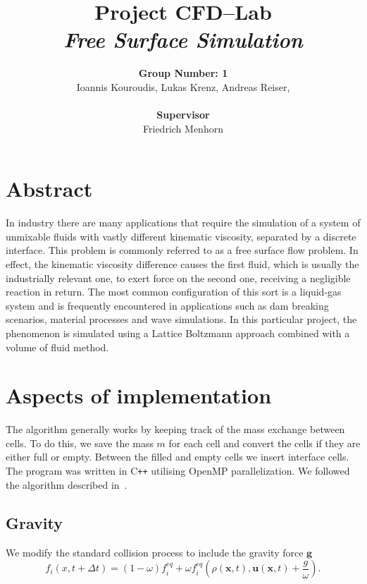\documentclass[10pt,a4paper,notitlepage]{article}
\begin{document}
\title{Project CFD--Lab\\ \textit{Free Surface Simulation}}
\author{\textbf{Group Number: 1}\\Ioannis Kouroudis, Lukas Krenz, Andreas Reiser,  \\ \\\textbf{Supervisor}\\Friedrich Menhorn}
\maketitle
\section*{Abstract}
In industry there are many applications that require the simulation of a system of unmixable fluids with vastly different kinematic viscosity, separated by a discrete interface.  This problem is commonly referred to as a free surface flow problem. In effect, the kinematic viscosity difference causes the first fluid, which is usually the industrially relevant one, to exert force on the second one, receiving a negligible reaction in return. The most common configuration of this sort is a liquid-gas system and is frequently encountered in applications such as dam breaking scenarios, material processes and wave simulations.
In this particular project, the phenomenon is simulated  using a Lattice Boltzmann approach combined with a volume of fluid method.
        
\section{Aspects of implementation}
The algorithm generally works by keeping track of the mass exchange between cells.
To do this, we save the mass $m$ for each cell and convert the cells if they are either full or empty.
Between the filled and empty cells we insert interface cells.
The program was written in C\texttt{++} utilising OpenMP parallelization.
We followed the algorithm described in~\cite{thurey2007physically}.

\subsection{Gravity }
We modify the standard collision process to include the gravity force $\bm{g}$~\cite{thurey2006optimization}
\begin{equation}\label{eq:BGK}
f_{i}(x,t+\Delta t)=(1-\omega)f_{i}^{eq}+\omega f_{i}^{eq}(\rho(\mathbf{x},t),\mathbf{u}(\mathbf{x},t)+\frac{g}{\omega}).
\end{equation}
\end{document}
